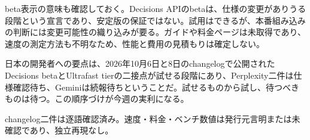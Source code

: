 beta表示の意味も確認しておく。Decisions APIのbetaは、仕様の変更がありうる段階という宣言であり、安定版の保証ではない。試用はできるが、本番組み込みの判断には変更可能性の織り込みが要る。ガイドや料金ページは未取得であり、速度の測定方法も不明なため、性能と費用の見積もりは確定しない。\cite{decisions}

日本の開発者への要点は、2026年10月6日と8日のchangelogで公開されたDecisions betaとUltrafast tierの二接点が試せる段階にあり、Perplexity二件は仕様確認待ち、Geminiは続報待ちということだ。試せるものから試し、待つべきものは待つ。この順序づけが今週の実利になる。\cite{decisions}\cite{ultrafast}

\begin{technicalnote}[Note]
changelog二件は逐語確認済み。速度・料金・ベンチ数値は発行元言明または未確認であり、独立再現なし。
\end{technicalnote}
